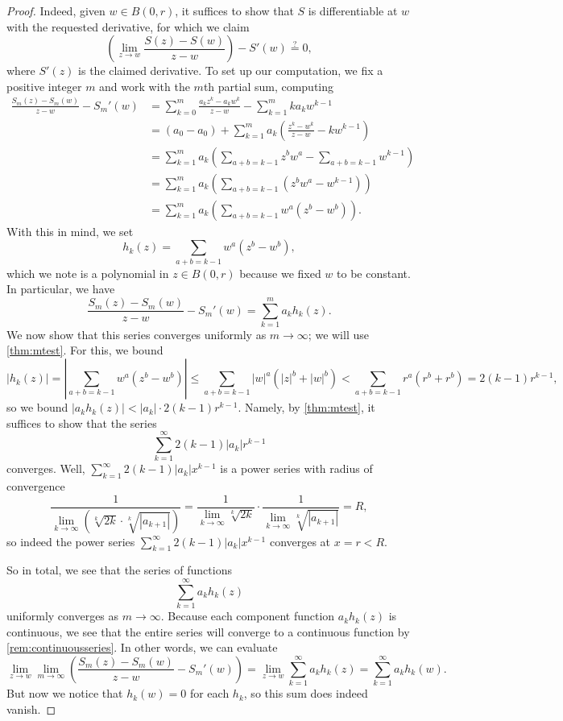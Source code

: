 \begin{proof}
	Indeed, given $w\in B(0,r)$, it suffices to show that $S$ is differentiable at $w$ with the requested derivative, for which we claim
	\[\left(\lim_{z\to w}\frac{S(z)-S(w)}{z-w}\right)-S'(w)\stackrel?=0,\]
	where $S'(z)$ is the claimed derivative. To set up our computation, we fix a positive integer $m$ and work with the $m$th partial sum, computing
	\begin{align*}
		\frac{S_m(z)-S_m(w)}{z-w}-S_m'(w) &= \sum_{k=0}^m\frac{a_kz^k-a_kw^k}{z-w}-\sum_{k=1}^mka_kw^{k-1} \\
		&= (a_0-a_0)+\sum_{k=1}^ma_k\left(\frac{z^k-w^k}{z-w}-kw^{k-1}\right) \\
		&= \sum_{k=1}^ma_k\left(\sum_{a+b=k-1}z^bw^a-\sum_{a+b=k-1}w^{k-1}\right) \\
		&= \sum_{k=1}^ma_k\left(\sum_{a+b=k-1}\left(z^bw^a-w^{k-1}\right)\right) \\
		&= \sum_{k=1}^ma_k\left(\sum_{a+b=k-1}w^a\left(z^b-w^b\right)\right).
	\end{align*}
	With this in mind, we set
	\[h_k(z)=\sum_{a+b=k-1}w^a\left(z^b-w^b\right),\]
	which we note is a polynomial in $z\in B(0,r)$ because we fixed $w$ to be constant. In particular, we have
	\[\frac{S_m(z)-S_m(w)}{z-w}-S_m'(w)=\sum_{k=1}^ma_kh_k(z).\]
	We now show that this series converges uniformly as $m\to\infty$; we will use \autoref{thm:mtest}. For this, we bound
	\[|h_k(z)|=\left|\sum_{a+b=k-1}w^a\left(z^b-w^b\right)\right|\le\sum_{a+b=k-1}|w|^a\left(|z|^b+|w|^b\right)<\sum_{a+b=k-1}r^a\left(r^b+r^b\right)=2(k-1)r^{k-1},\]
	so we bound $|a_kh_k(z)|<|a_k|\cdot2(k-1)r^{k-1}$. Namely, by \autoref{thm:mtest}, it suffices to show that the series
	\[\sum_{k=1}^\infty2(k-1)|a_k|r^{k-1}\]
	converges. Well, $\sum_{k=1}^\infty2(k-1)|a_k|x^{k-1}$ is a power series with radius of convergence
	\[\frac1{\lim_{k\to\infty}\left(\sqrt[k]{2k}\cdot\sqrt[k]{|a_{k+1}|}\right)}=\frac1{\lim_{k\to\infty}\sqrt[k]{2k}}\cdot\frac1{\lim_{k\to\infty}\sqrt[k]{|a_{k+1}|}}=R,\]
	so indeed the power series $\sum_{k=1}^\infty2(k-1)|a_k|x^{k-1}$ converges at $x=r<R$.

	So in total, we see that the series of functions
	\[\sum_{k=1}^\infty a_kh_k(z)\]
	uniformly converges as $m\to\infty$. Because each component function $a_kh_k(z)$ is continuous, we see that the entire series will converge to a continuous function by \autoref{rem:continuousseries}. In other words, we can evaluate
	\[\lim_{z\to w}\lim_{m\to\infty}\left(\frac{S_m(z)-S_m(w)}{z-w}-S_m'(w)\right)=\lim_{z\to w}\sum_{k=1}^\infty a_kh_k(z)=\sum_{k=1}^\infty a_kh_k(w).\]
	But now we notice that $h_k(w)=0$ for each $h_k$, so this sum does indeed vanish.


\end{proof}
